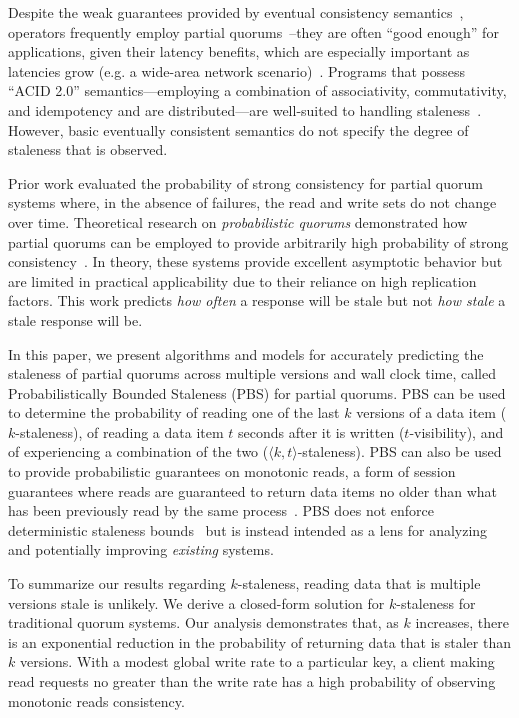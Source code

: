 \documentclass{vldb}
\begin{document}
Despite the weak guarantees provided by eventual consistency
semantics~\cite{hamilton-cap, cops, walter}, operators frequently
employ partial quorums~\cite{cassandra, feinbergpc}--they are often
``good enough'' for applications, given their latency benefits, which
are especially important as latencies grow (e.g. a wide-area network
scenario)~\cite{abadilatconsist, feinbergpc}.  Programs that possess
``ACID 2.0'' semantics---employing a combination of associativity,
commutativity, and idempotency and are distributed---are well-suited
to handling staleness~\cite{calm, helland}.  However, basic eventually
consistent semantics do not specify the degree of staleness that is
observed.

Prior work evaluated the probability of strong consistency for 
partial quorum systems where, in the absence of failures, the read
and write sets do not change over time.  Theoretical research on
\textit{probabilistic quorums} demonstrated how partial quorums can be
employed to provide arbitrarily high probability of strong
consistency~\cite{prob-quorum, quorum-overview}. In theory, these
systems provide excellent asymptotic behavior but are limited in
practical applicability due to their reliance on high replication
factors.  This work predicts \textit{how often} a response will be
stale but not \textit{how stale} a stale response will be.

In this paper, we present algorithms and models for accurately
predicting the staleness of partial quorums across multiple versions
and wall clock time, called Probabilistically Bounded Staleness (PBS)
for partial quorums. PBS can be used to determine the probability of
reading one of the last $k$ versions of a data item ($k$-staleness),
of reading a data item $t$ seconds after it is written
($t$-visibility), and of experiencing a combination of the two
($\langle k, t \rangle$-staleness).  PBS can also be used to provide
probabilistic guarantees on monotonic reads, a form of session
guarantees where reads are guaranteed to return data items no older
than what has been previously read by the same
process~\cite{sessionguarantees, vogels-defs}.  PBS does not enforce
deterministic staleness bounds~\cite{ aqua, trapp,vahdat-article,
  vahdat-bounded, frac} but is instead intended as a lens for
analyzing and potentially improving \textit{existing} systems.

To summarize our results regarding $k$-staleness, reading data that is
multiple versions stale is unlikely.  We derive a closed-form solution
for $k$-staleness for traditional quorum systems.  Our analysis
demonstrates that, as $k$ increases, there is an exponential reduction
in the probability of returning data that is staler than $k$
versions. With a modest global write rate to a particular key, a
client making read requests no greater than the write rate has a high
probability of observing monotonic reads consistency.
  
\end{document}

